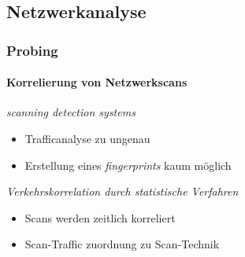 \documentclass[10pt]{beamer} %
\begin{document}
\subsection{Netzwerkanalyse}
\begin{frame}
\frametitle{Probing}
\framesubtitle{Korrelierung von Netzwerkscans}

\begin{alertblock}{\textit{scanning detection systems}}
    \begin{itemize}
        \item Trafficanalyse zu ungenau
        \item Erstellung eines \textit{fingerprints} kaum möglich
        \end{itemize}
\end{alertblock}

\begin{exampleblock}{\textit{Verkehrskorrelation durch statistische Verfahren}}
    \begin{itemize}
         \item Scans werden zeitlich korreliert
         \item Scan-Traffic zuordnung zu Scan-Technik
    \end{itemize}
\end{exampleblock}

\end{frame}

\end{document}
